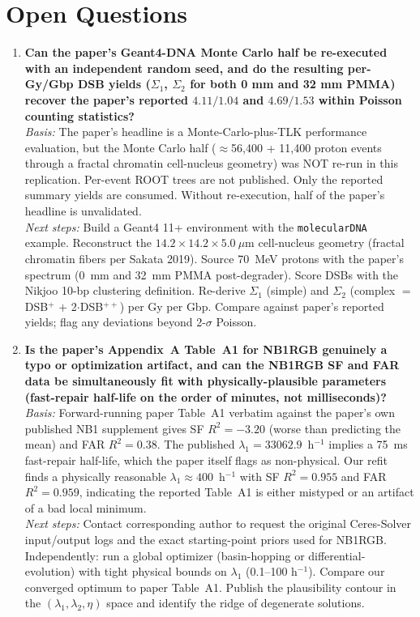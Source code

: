 \section*{Open Questions}

\begin{enumerate}

\item \textbf{Can the paper's Geant4-DNA Monte Carlo half be re-executed with an
independent random seed, and do the resulting per-Gy/Gbp DSB yields
($\Sigma_1$, $\Sigma_2$ for both 0 mm and 32 mm PMMA) recover the paper's
reported $4.11/1.04$ and $4.69/1.53$ within Poisson counting statistics?}\\
\textit{Basis:} The paper's headline is a Monte-Carlo-plus-TLK performance
evaluation, but the Monte Carlo half ($\approx$56{,}400 + 11{,}400 proton events
through a fractal chromatin cell-nucleus geometry) was NOT re-run in this
replication. Per-event ROOT trees are not published. Only the reported summary
yields are consumed. Without re-execution, half of the paper's headline is
unvalidated.\\
\textit{Next steps:} Build a Geant4 11+ environment with the \texttt{molecularDNA}
example. Reconstruct the $14.2 \times 14.2 \times 5.0\ \mu$m cell-nucleus
geometry (fractal chromatin fibers per Sakata 2019). Source 70~MeV protons with
the paper's spectrum (0~mm and 32~mm PMMA post-degrader). Score DSBs with the
Nikjoo 10-bp clustering definition. Re-derive $\Sigma_1$ (simple) and $\Sigma_2$
(complex $=$ DSB$^+$ $+$ 2$\cdot$DSB$^{++}$) per Gy per Gbp. Compare against
paper's reported yields; flag any deviations beyond 2-$\sigma$ Poisson.

\item \textbf{Is the paper's Appendix~A Table~A1 for NB1RGB genuinely a typo or
optimization artifact, and can the NB1RGB SF and FAR data be simultaneously fit
with physically-plausible parameters (fast-repair half-life on the order of
minutes, not milliseconds)?}\\
\textit{Basis:} Forward-running paper Table~A1 verbatim against the paper's own
published NB1 supplement gives SF $R^2 = -3.20$ (worse than predicting the mean)
and FAR $R^2 = 0.38$. The published $\lambda_1 = 33062.9$~h$^{-1}$ implies a 75~ms
fast-repair half-life, which the paper itself flags as non-physical. Our refit
finds a physically reasonable $\lambda_1 \approx 400$~h$^{-1}$ with SF $R^2 = 0.955$
and FAR $R^2 = 0.959$, indicating the reported Table~A1 is either mistyped or an
artifact of a bad local minimum.\\
\textit{Next steps:} Contact corresponding author to request the original
Ceres-Solver input/output logs and the exact starting-point priors used for
NB1RGB. Independently: run a global optimizer (basin-hopping or
differential-evolution) with tight physical bounds on $\lambda_1$ (0.1--100
h$^{-1}$). Compare our converged optimum to paper Table~A1. Publish the
plausibility contour in the $(\lambda_1, \lambda_2, \eta)$ space and identify the
ridge of degenerate solutions.


\end{enumerate}
